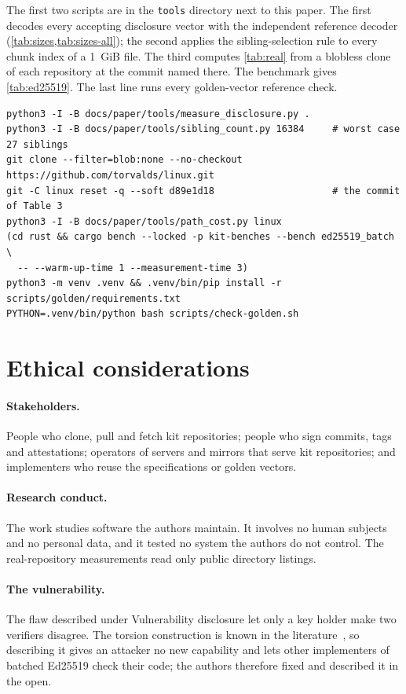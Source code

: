 \documentclass[10pt,letterpaper]{article}
\theoremstyle{remark}
\newcommand{\kit}{\textsf{kit}}
\begin{document}
The first two scripts are in the \texttt{tools} directory next to this paper.
The first decodes every accepting disclosure vector with the independent
reference decoder (\cref{tab:sizes,tab:sizes-all}); the second applies the
sibling-selection rule to every chunk index of a 1~GiB file. The third
computes \cref{tab:real} from a blobless clone of each repository at the
commit named there. The benchmark gives \cref{tab:ed25519}. The last line runs
every golden-vector reference check.
\begin{lstlisting}[style=kitshell]
python3 -I -B docs/paper/tools/measure_disclosure.py .
python3 -I -B docs/paper/tools/sibling_count.py 16384     # worst case 27 siblings
git clone --filter=blob:none --no-checkout https://github.com/torvalds/linux.git
git -C linux reset -q --soft d89e1d18                     # the commit of Table 3
python3 -I -B docs/paper/tools/path_cost.py linux
(cd rust && cargo bench --locked -p kit-benches --bench ed25519_batch \
  -- --warm-up-time 1 --measurement-time 3)
python3 -m venv .venv && .venv/bin/pip install -r scripts/golden/requirements.txt
PYTHON=.venv/bin/python bash scripts/check-golden.sh
\end{lstlisting}

\section{Ethical considerations}\label{app:ethics}

\paragraph{Stakeholders.} People who clone, pull and fetch \kit{}
repositories; people who sign commits, tags and attestations; operators of
servers and mirrors that serve \kit{} repositories; and implementers who reuse
the specifications or golden vectors.

\paragraph{Research conduct.} The work studies software the authors maintain.
It involves no human subjects and no personal data, and it tested no system
the authors do not control. The real-repository measurements read only public
directory listings.

\paragraph{The vulnerability.} The flaw described under Vulnerability
disclosure let only a key holder make two verifiers disagree. The torsion construction is known in
the literature~\cite{taming}, so describing it gives an attacker no new
capability and lets other implementers of batched Ed25519 check their code;
the authors therefore fixed and described it in the open.
\end{document}
